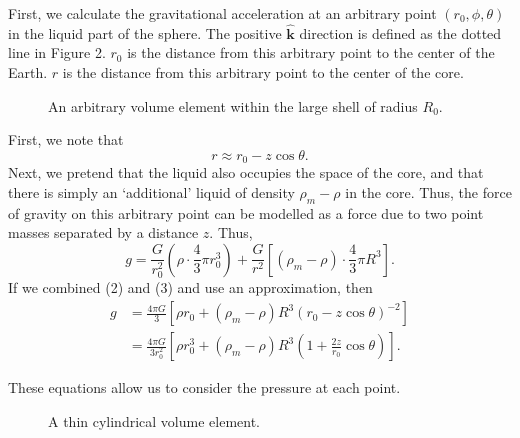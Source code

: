 \documentclass[12pt]{article}
\begin{document}
First, we calculate the gravitational acceleration at an arbitrary point $(r_0,\phi,\theta)$ in the liquid part of the sphere.  The positive $\hat{\mathbf{k}}$ direction is defined as the dotted line in Figure 2.  $r_0$ is the distance from this arbitrary point to the center of the Earth.  $r$ is the distance from this arbitrary point to the center of the core.  

\begin{figure}[ht]
	\centering
	\caption{An arbitrary volume element within the large shell of radius $R_0$.  }
\end{figure}

First, we note that 
\begin{equation}
	r \approx r_0 - z\cos\theta.
\end{equation}
Next, we pretend that the liquid also occupies the space of the core, and that there is simply an `additional' liquid of density $\rho_m - \rho$ in the core.  Thus, the force of gravity on this arbitrary point can be modelled as a force due to two point masses separated by a distance $z.$  Thus,
\begin{equation}
	g = \frac{G}{r_0^2}\left( \rho\cdot \frac{4}{3}\pi r_0^3 \right) + \frac{G}{r^2}\left[ (\rho_m - \rho)\cdot \frac{4}{3}\pi R^3 \right].
\end{equation}
If we combined (2) and (3) and use an approximation, then
\begin{align*}
	g &= \frac{4\pi G}{3} \left[ \rho r_0 + (\rho_m - \rho)R^3 (r_0-z\cos\theta)^{-2} \right] \\
	  &= \frac{4\pi G}{3 r_0^2} \left[ \rho r_0^3 + (\rho_m-\rho)R^3\left( 1+\frac{2z}{r_0}\cos\theta \right) \right].
\end{align*}

These equations allow us to consider the pressure at each point.  

\begin{figure}[ht]
	\centering
	\caption{A thin cylindrical volume element.}
\end{figure}
\end{document}
